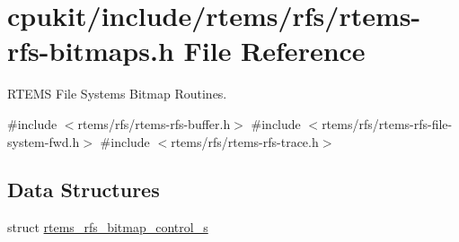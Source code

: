\hypertarget{rtems-rfs-bitmaps_8h}{}\section{cpukit/include/rtems/rfs/rtems-\/rfs-\/bitmaps.h File Reference}
\label{rtems-rfs-bitmaps_8h}


R\+T\+E\+MS File Systems Bitmap Routines.  


{\ttfamily \#include $<$rtems/rfs/rtems-\/rfs-\/buffer.\+h$>$}\newline
{\ttfamily \#include $<$rtems/rfs/rtems-\/rfs-\/file-\/system-\/fwd.\+h$>$}\newline
{\ttfamily \#include $<$rtems/rfs/rtems-\/rfs-\/trace.\+h$>$}\newline
\subsection*{Data Structures}
\begin{DoxyCompactItemize}
\item 
struct \mbox{\hyperlink{structrtems__rfs__bitmap__control__s}{rtems\+\_\+rfs\+\_\+bitmap\+\_\+control\+\_\+s}}
\end{DoxyCompactItemize}
